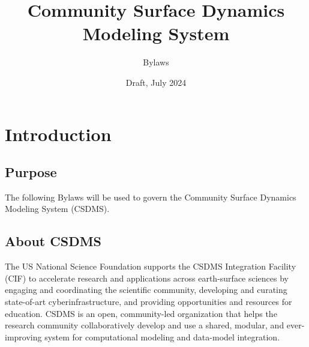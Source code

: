 \documentclass[11pt, oneside]{article}   	%
\title{Community Surface Dynamics Modeling System}
\author{Bylaws}
\date{Draft, July 2024}							%
\def\article#1{
\renewcommand{\thesection}{Article \Roman{section}} 
\section[Article]{#1}
\renewcommand{\thesection}{\Roman{section}} 
}
\begin{document}
\maketitle

\article{Introduction}

\subsection{Purpose}

The following Bylaws will be used to govern the Community Surface Dynamics Modeling System (CSDMS). 

\subsection{About CSDMS}

The US National Science Foundation supports the CSDMS Integration Facility (CIF) to accelerate research and applications across earth-surface sciences by engaging and coordinating the scientific community, developing and curating state-of-art cyberinfrastructure, and providing opportunities and resources for education. CSDMS is an open, community-led organization that helps the research community collaboratively develop and use a shared, modular, and ever-improving system for computational modeling and data-model integration.




\subsubsection{}
\end{document}
